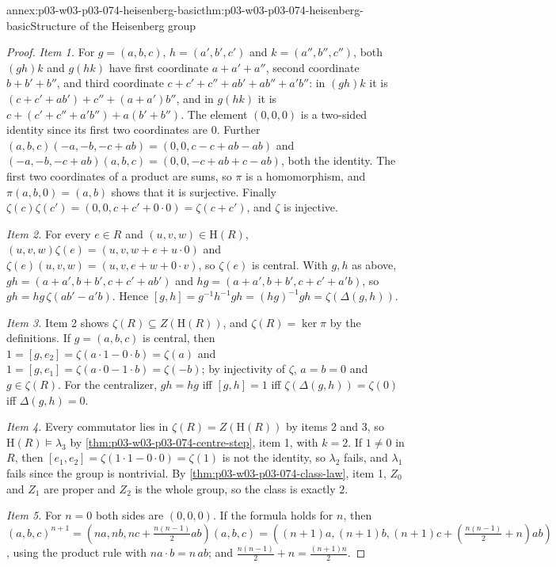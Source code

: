 \begin{annexitem}{annex:p03-w03-p03-074-heisenberg-basic}{thm:p03-w03-p03-074-heisenberg-basic}{Structure of the Heisenberg group}
\begin{proof}
\emph{Item 1.} For \(g=(a,b,c)\), \(h=(a',b',c')\) and
\(k=(a'',b'',c'')\), both \((gh)k\) and \(g(hk)\) have first coordinate
\(a+a'+a''\), second coordinate \(b+b'+b''\), and third coordinate
\(c+c'+c''+ab'+ab''+a'b''\): in \((gh)k\) it is
\((c+c'+ab')+c''+(a+a')b''\), and in \(g(hk)\) it is
\(c+(c'+c''+a'b'')+a(b'+b'')\). The element \((0,0,0)\) is a two-sided
identity since its first two coordinates are \(0\). Further
\((a,b,c)(-a,-b,-c+ab)=(0,0,c-c+ab-ab)\) and
\((-a,-b,-c+ab)(a,b,c)=(0,0,-c+ab+c-ab)\), both the identity. The
first two coordinates of a product are sums, so \(\pi\) is a homomorphism,
and \(\pi(a,b,0)=(a,b)\) shows that it is surjective. Finally
\(\zeta(c)\zeta(c')=(0,0,c+c'+0\cdot0)=\zeta(c+c')\), and \(\zeta\) is
injective.

\emph{Item 2.} For every \(e\in R\) and \((u,v,w)\in\mathrm H(R)\),
\((u,v,w)\zeta(e)=(u,v,w+e+u\cdot0)\) and
\(\zeta(e)(u,v,w)=(u,v,e+w+0\cdot v)\), so \(\zeta(e)\) is central. With
\(g,h\) as above, \(gh=(a+a',b+b',c+c'+ab')\) and
\(hg=(a+a',b+b',c+c'+a'b)\), so \(gh=hg\,\zeta(ab'-a'b)\). Hence
\([g,h]=g^{-1}h^{-1}gh=(hg)^{-1}gh=\zeta(\Delta(g,h))\).

\emph{Item 3.} Item 2 shows \(\zeta(R)\subseteq Z(\mathrm H(R))\), and
\(\zeta(R)=\ker\pi\) by the definitions. If \(g=(a,b,c)\) is central,
then \(1=[g,e_2]=\zeta(a\cdot1-0\cdot b)=\zeta(a)\) and
\(1=[g,e_1]=\zeta(a\cdot0-1\cdot b)=\zeta(-b)\); by injectivity of
\(\zeta\), \(a=b=0\) and \(g\in\zeta(R)\). For the centralizer,
\(gh=hg\) iff \([g,h]=1\) iff \(\zeta(\Delta(g,h))=\zeta(0)\) iff
\(\Delta(g,h)=0\).

\emph{Item 4.} Every commutator lies in \(\zeta(R)=Z(\mathrm H(R))\) by
items 2 and 3, so \(\mathrm H(R)\models\lambda_3\) by
\cref{thm:p03-w03-p03-074-centre-step}, item 1, with \(k=2\). If
\(1\neq0\) in \(R\), then \([e_1,e_2]=\zeta(1\cdot1-0\cdot0)=\zeta(1)\)
is not the identity, so \(\lambda_2\) fails, and \(\lambda_1\) fails since
the group is nontrivial. By \cref{thm:p03-w03-p03-074-class-law}, item 1,
\(Z_0\) and \(Z_1\) are proper and \(Z_2\) is the whole group, so the
class is exactly \(2\).

\emph{Item 5.} For \(n=0\) both sides are \((0,0,0)\). If the formula holds
for \(n\), then
\((a,b,c)^{n+1}=(na,nb,nc+\tfrac{n(n-1)}2ab)(a,b,c)
=((n+1)a,(n+1)b,(n+1)c+(\tfrac{n(n-1)}2+n)ab)\), using the product rule
with \(na\cdot b=n\,ab\); and \(\tfrac{n(n-1)}2+n=\tfrac{(n+1)n}2\).
\end{proof}
\end{annexitem}

